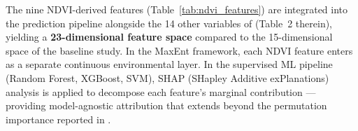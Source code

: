 \documentclass[12pt, a4paper]{article}
\begin{document}
The nine NDVI-derived features (Table~\ref{tab:ndvi_features}) are
integrated into the prediction pipeline alongside the 14 other
variables of \citet{biswas2025} (Table~2 therein), yielding a
\textbf{23-dimensional feature space} compared to the 15-dimensional
space of the baseline study. In the MaxEnt framework, each NDVI
feature enters as a separate continuous environmental layer. In the
supervised ML pipeline (Random Forest, XGBoost, SVM), SHAP
(SHapley Additive exPlanations) analysis \citep{lundberg2017} is
applied to decompose each feature's marginal contribution — providing
model-agnostic attribution that extends beyond the permutation
importance reported in \citet{biswas2025}.

\newpage



%
%
%
%
%
%
%
%
%
%
%
\end{document}
